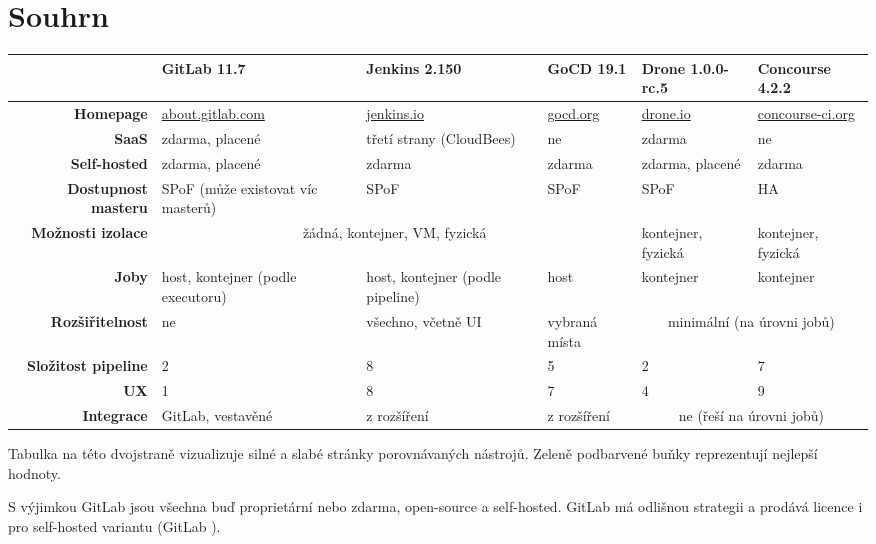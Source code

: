 \clearpage
\section{Souhrn}
    \label{overview}

    \begin{adjustwidth}{-2cm}{}
        \begin{tabular}{|r||p{3.2cm}|p{3.2cm}|p{2cm}|p{2cm}|p{2cm}|}\hline
            & \textbf{GitLab 11.7} & \textbf{Jenkins 2.150} & \textbf{GoCD 19.1} & \textbf{Drone 1.0.0-rc.5} & \textbf{Concourse 4.2.2} \\\hline\hline
            \textbf{Homepage} & \url{about.gitlab.com} & \url{jenkins.io} & \url{gocd.org} & \url{drone.io} & \url{concourse-ci.org} \\\hline
            \textbf{SaaS} & zdarma, placené & třetí strany (CloudBees) & ne & zdarma & ne \\\hline
            \textbf{Self-hosted} & zdarma, placené & zdarma & zdarma & zdarma, placené & zdarma \\\hline
            \textbf{Dostupnost masteru} & SPoF (může existovat víc masterů) & SPoF & SPoF & SPoF & HA \\\hline
            \textbf{Možnosti izolace} & \multicolumn{3}{c|}{ žádná, kontejner, VM, fyzická } & kontejner, fyzická & kontejner, fyzická \\\hline
            \textbf{Joby} & host, kontejner (podle executoru) & host, kontejner (podle pipeline) & host & kontejner & kontejner  \\\hline
            \textbf{Rozšiřitelnost} & ne & všechno, včetně UI & vybraná místa & \multicolumn{2}{c|}{ minimální (na úrovni jobů) } \\\hline
            \textbf{Složitost pipeline} & 2 & 8 & 5 & 2 & 7 \\\hline
            \textbf{UX} & 1 & 8 & 7 & 4 & 9  \\\hline
            \textbf{Integrace} & GitLab, vestavěné & z rozšíření & z rozšíření & \multicolumn{2}{c|}{ ne (řeší na úrovni jobů) } \\\hline
        \end{tabular}
    \end{adjustwidth}
    \vspace*{0.8cm}

    Tabulka na této dvojstraně vizualizuje silné a slabé stránky porovnávaných \CI nástrojů. Zeleně podbarvené buňky reprezentují nejlepší hodnoty.

    S výjimkou GitLab jsou všechna \CI buď proprietární  nebo zdarma, open-source a self-hosted. GitLab má odlišnou strategii a prodává licence i pro self-hosted variantu (GitLab ).

